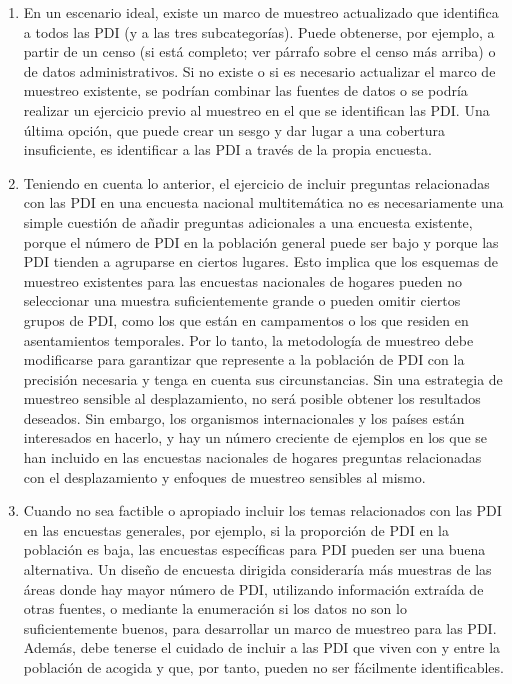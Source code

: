\documentclass[
]{book}
\begin{document}
\begin{enumerate}
\item
  En un escenario ideal, existe un marco de muestreo actualizado que identifica a todos las PDI (y a las tres subcategorías). Puede obtenerse, por ejemplo, a partir de un censo (si está completo; ver párrafo sobre el censo más arriba) o de datos administrativos. Si no existe o si es necesario actualizar el marco de muestreo existente, se podrían combinar las fuentes de datos o se podría realizar un ejercicio previo al muestreo en el que se identifican las PDI. Una última opción, que puede crear un sesgo y dar lugar a una cobertura insuficiente, es identificar a las PDI a través de la propia encuesta.
\item
  Teniendo en cuenta lo anterior, el ejercicio de incluir preguntas relacionadas con las PDI en una encuesta nacional multitemática no es necesariamente una simple cuestión de añadir preguntas adicionales a una encuesta existente, porque el número de PDI en la población general puede ser bajo y porque las PDI tienden a agruparse en ciertos lugares. Esto implica que los esquemas de muestreo existentes para las encuestas nacionales de hogares pueden no seleccionar una muestra suficientemente grande o pueden omitir ciertos grupos de PDI, como los que están en campamentos o los que residen en asentamientos temporales. Por lo tanto, la metodología de muestreo debe modificarse para garantizar que represente a la población de PDI con la precisión necesaria y tenga en cuenta sus circunstancias. Sin una estrategia de muestreo sensible al desplazamiento, no será posible obtener los resultados deseados. Sin embargo, los organismos internacionales y los países están interesados en hacerlo, y hay un número creciente de ejemplos en los que se han incluido en las encuestas nacionales de hogares preguntas relacionadas con el desplazamiento y enfoques de muestreo sensibles al mismo.
\item
  Cuando no sea factible o apropiado incluir los temas relacionados con las PDI en las encuestas generales, por ejemplo, si la proporción de PDI en la población es baja, las encuestas específicas para PDI pueden ser una buena alternativa. Un diseño de encuesta dirigida consideraría más muestras de las áreas donde hay mayor número de PDI, utilizando información extraída de otras fuentes, o mediante la enumeración si los datos no son lo suficientemente buenos, para desarrollar un marco de muestreo para las PDI. Además, debe tenerse el cuidado de incluir a las PDI que viven con y entre la población de acogida y que, por tanto, pueden no ser fácilmente identificables.

\end{enumerate}
\end{document}
